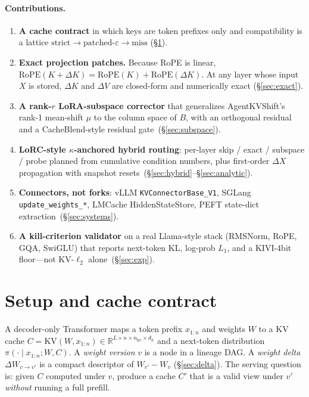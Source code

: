 \documentclass{article}
\begin{document}
\paragraph{Contributions.}
\begin{enumerate}[leftmargin=1.4em,itemsep=2pt]
\item \textbf{A cache contract} in which keys are token prefixes only and
compatibility is a lattice
$\mathrm{strict}\to\mathrm{patched}\text{-}\varepsilon\to\mathrm{miss}$
(\S\ref{sec:contract}).
\item \textbf{Exact projection patches.}
Because RoPE is linear,
$\mathrm{RoPE}(K+\Delta K)=\mathrm{RoPE}(K)+\mathrm{RoPE}(\Delta K)$.
At any layer whose input $X$ is stored, $\Delta K$ and $\Delta V$ are
closed-form and numerically exact (\S\ref{sec:exact}).
\item \textbf{A rank-$r$ LoRA-subspace corrector} that generalizes
AgentKVShift's rank-1 mean-shift $\mu$ to the column space of $B$,
with an orthogonal residual and a CacheBlend-style residual
gate~(\S\ref{sec:subspace}).
\item \textbf{LoRC-style $\kappa$-anchored hybrid routing}: per-layer
skip / exact / subspace / probe planned from cumulative condition
numbers, plus first-order $\Delta X$ propagation with snapshot
resets~(\S\ref{sec:hybrid}--\S\ref{sec:analytic}).
\item \textbf{Connectors, not forks}: vLLM \texttt{KVConnectorBase\_V1},
SGLang \texttt{update\_weights\_*}, LMCache HiddenStateStore, PEFT
state-dict extraction~(\S\ref{sec:systems}).
\item \textbf{A kill-criterion validator} on a real Llama-style stack
(RMSNorm, RoPE, GQA, SwiGLU) that reports next-token KL, log-prob
$L_1$, and a KIVI-4bit floor---not KV-$\ell_2$ alone~(\S\ref{sec:exp}).
\end{enumerate}

\section{Setup and cache contract}
\label{sec:contract}

A decoder-only Transformer maps a token prefix
$x_{1:n}$ and weights $W$ to a KV cache
$C=\mathrm{KV}(W,x_{1:n})\in\mathbb{R}^{L\times n\times n_{\mathrm{kv}}\times d_h}$
and a next-token distribution $\pi(\cdot\mid x_{1:n};W,C)$.
A \emph{weight version} $v$ is a node in a lineage DAG.
A \emph{weight delta} $\Delta W_{v\to v'}$ is a compact descriptor of
$W_{v'}-W_v$ (\S\ref{sec:delta}).
The serving question is: given $C$ computed under $v$, produce a cache
$C'$ that is a valid view under $v'$ \emph{without} running a full prefill.
\end{document}
